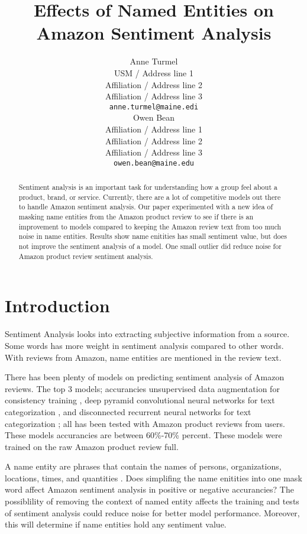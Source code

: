 \documentclass[11pt,a4paper]{article}
\title{Effects of Named Entities on Amazon Sentiment Analysis}
\author{Anne Turmel \\
  USM / Address line 1 \\
  Affiliation / Address line 2 \\
  Affiliation / Address line 3 \\
  \texttt{anne.turmel@maine.edi} \\\And
  Owen Bean \\
  Affiliation / Address line 1 \\
  Affiliation / Address line 2 \\
  Affiliation / Address line 3 \\
  \texttt{owen.bean@maine.edu} \\}
\date{}
\begin{document}
\maketitle
\begin{abstract}
Sentiment analysis is an important task for understanding how a group feel about a product, brand, or service. Currently, there are a lot of competitive models out there to handle Amazon sentiment analysis. Our paper experimented with a new idea of masking name entities from the Amazon product review to see if there is an improvement to models compared to keeping the Amazon review text from too much noise in name entities. Results show name enitities has small sentiment value, but does not improve the sentiment analysis of a model. One small outlier did reduce noise for Amazon product review sentiment analysis.

\end{abstract}

\section{Introduction}

Sentiment Analysis looks into extracting subjective information from a source. Some words has more weight in sentiment analysis compared to other words. With reviews from Amazon, name entities are mentioned in the review text. 

There has been plenty of models on predicting sentiment analysis of Amazon reviews. The top 3 models; accurancies unsupervised data augmentation for consistency training \cite{unsupervised}, deep pyramid convolutional neural networks for text categorization \cite{pyramid}, and disconnected recurrent neural networks for text categorization \cite{disconnect}; all has been tested with Amazon product reviews from users. These models accurancies are between 60\%-70\% percent. These models were trained on the raw Amazon product review full.

A name entity are phrases that contain the names of persons, organizations, locations, times, and quantities \cite{conll}. Does simplifing the name enitities into one mask word affect Amazon sentiment analysis in positive or negative accurancies? The possiblility of removing the context of named entity affects the training and tests of sentiment analysis could reduce noise for better model performance. Moreover, this will determine if name entities hold any sentiment value.
\end{document}
